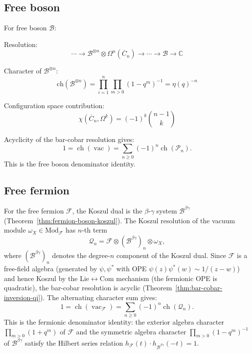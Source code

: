 \subsection{Free boson}

\begin{calculation}
For free boson $\mathcal{B}$:

Resolution:
\[
\cdots \to \mathcal{B}^{\otimes n} \otimes \Omega^n(\overline{C}_n) \to \cdots \to \mathcal{B} \to \mathbb{C}
\]

Character of $\mathcal{B}^{\otimes n}$:
\[
\text{ch}(\mathcal{B}^{\otimes n}) = \prod_{i=1}^n \prod_{m > 0} (1 - q^m)^{-1} = \eta(q)^{-n}
\]

Configuration space contribution:
\[
\chi(\overline{C}_n, \Omega^k) = (-1)^k \binom{n-1}{k}
\]

Acyclicity of the bar-cobar resolution gives:
\[
1 = \operatorname{ch}(\operatorname{vac}) = \sum_{n \geq 0} (-1)^n \operatorname{ch}(\mathcal{P}_n).
\]
This is the free boson denominator identity.
\end{calculation}

\subsection{Free fermion}

\begin{calculation}
For the free fermion $\mathcal{F}$, the Koszul dual is the
$\beta$-$\gamma$ system $\mathcal{B}^{\beta\gamma}$
(Theorem~\ref{thm:fermion-boson-koszul}).
The Koszul resolution of the vacuum module
$\omega_X \in \mathrm{Mod}_{\mathcal{F}}$ has $n$-th term
\[
\mathcal{Q}_n
= \mathcal{F} \otimes (\mathcal{B}^{\beta\gamma})_n \otimes \omega_X,
\]
where $(\mathcal{B}^{\beta\gamma})_n$ denotes the degree-$n$ component
of the Koszul dual.  Since $\mathcal{F}$ is a free-field algebra
(generated by $\psi, \psi^*$ with OPE
$\psi(z)\psi^*(w) \sim 1/(z-w)$) and hence Koszul by the
Lie$\leftrightarrow$Com mechanism
(the fermionic OPE is quadratic), the bar-cobar resolution is acyclic
(Theorem~\ref{thm:bar-cobar-inversion-qi}).  The alternating character
sum gives:
\[
1 = \operatorname{ch}(\operatorname{vac}_{\mathcal{F}})
= \sum_{n \geq 0} (-1)^n \operatorname{ch}(\mathcal{Q}_n).
\]
This is the fermionic denominator identity: the exterior algebra
character $\prod_{m > 0}(1 + q^m)$ of $\mathcal{F}$ and the symmetric
algebra character $\prod_{m > 0}(1 - q^m)^{-1}$ of $\mathcal{B}^{\beta\gamma}$
satisfy the Hilbert series relation
$h_{\mathcal{F}}(t) \cdot h_{\mathcal{B}^{\beta\gamma}}(-t) = 1$.
\end{calculation}

